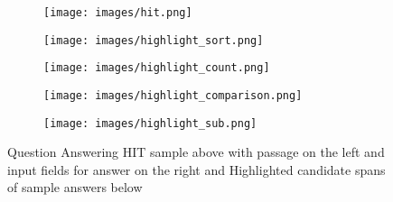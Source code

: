 









\newpage
\appendix















\begin{figure*}[t]
    \centering
    \begin{subfigure}[t]{\textwidth}
        \centering
        \texttt{[image: images/hit.png]}
    \end{subfigure}
    \begin{subfigure}[t]{\textwidth}
        \centering
        \texttt{[image: images/highlight\_sort.png]}
    \end{subfigure}
    \begin{subfigure}[t]{\textwidth}
        \centering
        \texttt{[image: images/highlight\_count.png]}
    \end{subfigure}
     \begin{subfigure}[t]{\textwidth}
        \centering
        \texttt{[image: images/highlight\_comparison.png]}
    \end{subfigure}
     \begin{subfigure}[t]{\textwidth}
        \centering
        \texttt{[image: images/highlight\_sub.png]}
    \end{subfigure}
    
    
    \caption{Question Answering HIT sample above with passage on the left and input fields for answer on the right and Highlighted candidate spans of sample answers below}
    \label{fig:question_types}
\end{figure*}








%

